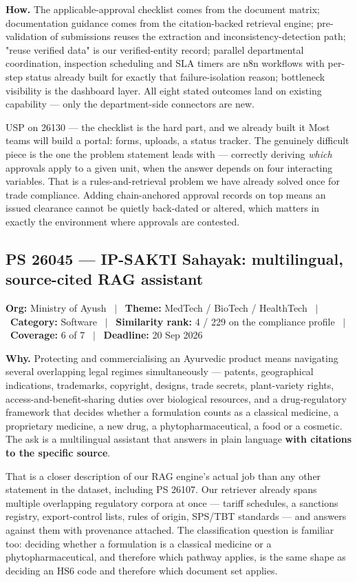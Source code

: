 \documentclass[11pt]{article}
\newcommand{\psbanner}[6]{%
  \vspace{0.2em}
  {\footnotesize\color{gxslate}\textbf{Org:} #1 \ $\vert$ \ \textbf{Theme:} #2 \ $\vert$ \ \textbf{Category:} #3 \ $\vert$ \ \textbf{Similarity rank:} #4 \ $\vert$ \ \textbf{Coverage:} #5 \ $\vert$ \ \textbf{Deadline:} #6}
  \par\vspace{0.6em}
}
\begin{document}
\vspace{0.5em}
\noindent\textbf{How.} The applicable-approval checklist comes from the document matrix; documentation
guidance comes from the citation-backed retrieval engine; pre-validation of submissions reuses the
extraction and inconsistency-detection path; "reuse verified data" is our verified-entity record; parallel
departmental coordination, inspection scheduling and SLA timers are n8n workflows with per-step status
already built for exactly that failure-isolation reason; bottleneck visibility is the dashboard layer.
All eight stated outcomes land on existing capability --- only the department-side connectors are new.

\begin{uspbox}{USP on 26130 --- the checklist is the hard part, and we already built it}
Most teams will build a portal: forms, uploads, a status tracker. The genuinely difficult piece is the one
the problem statement leads with --- correctly deriving \emph{which} approvals apply to a given unit, when
the answer depends on four interacting variables. That is a rules-and-retrieval problem we have already
solved once for trade compliance. Adding chain-anchored approval records on top means an issued clearance
cannot be quietly back-dated or altered, which matters in exactly the environment where approvals are
contested.
\end{uspbox}

\subsection*{PS 26045 --- IP-SAKTI Sahayak: multilingual, source-cited RAG assistant}
\psbanner{Ministry of Ayush}{MedTech / BioTech / HealthTech}{Software}{4 / 229 on the compliance profile}{6 of 7}{20 Sep 2026}

\noindent\textbf{Why.} Protecting and commercialising an Ayurvedic product means navigating several
overlapping legal regimes simultaneously --- patents, geographical indications, trademarks, copyright,
designs, trade secrets, plant-variety rights, access-and-benefit-sharing duties over biological resources,
and a drug-regulatory framework that decides whether a formulation counts as a classical medicine, a
proprietary medicine, a new drug, a phytopharmaceutical, a food or a cosmetic. The ask is a multilingual
assistant that answers in plain language \textbf{with citations to the specific source}.

That is a closer description of our RAG engine's actual job than any other statement in the dataset,
including PS 26107. Our retriever already spans multiple overlapping regulatory corpora at once --- tariff
schedules, a sanctions registry, export-control lists, rules of origin, SPS/TBT standards --- and answers
against them with provenance attached. The classification question is familiar too: deciding whether a
formulation is a classical medicine or a phytopharmaceutical, and therefore which pathway applies, is the
same shape as deciding an HS6 code and therefore which document set applies.
\end{document}
